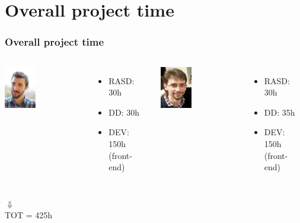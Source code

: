 \documentclass[professionalfonts]{beamer}
\begin{document}
\section{Overall project time}
\begin{frame}
\frametitle{Overall project time}
\begin{columns}[c]
\includegraphics[width=0.4\textwidth]{images/andrea}
\begin{itemize}
\item RASD: 30h
\item DD: 30h
\item DEV: 150h (front-end)
\end{itemize}

\includegraphics[width=0.4\textwidth]{images/stefano}
\begin{itemize}
\item RASD: 30h
\item DD: 35h
\item DEV: 150h (front-end)
\end{itemize}
\end{columns}
\begin{center}
$\Downarrow$\\
TOT = 425h
\end{center}
\end{frame}
\end{document}
